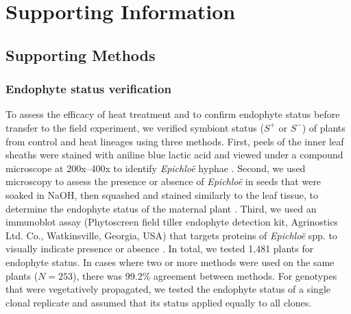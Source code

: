 \documentclass[12pt]{article}\usepackage[]{graphicx}\usepackage[dvipsnames]{xcolor}
\begin{document}
\setcounter{figure}{0}
\setcounter{table}{0}
\setcounter{equation}{0}
\setcounter{section}{0}

\renewcommand{\thesection}{S.\arabic{section}}

\renewcommand{\theequation}{S\arabic{equation}}

\renewcommand{\figurename}{Fig}
\renewcommand{\thefigure}{S\arabic{figure}}

\renewcommand{\thetable}{S\arabic{table}}
\renewcommand{\tablename}{Table}

\section {Supporting Information}
\subsection {Supporting Methods}
\subsubsection {Endophyte status verification}
To assess the efficacy of heat treatment and to confirm endophyte status before transfer to the field experiment, we verified symbiont status ($S^+$ or $S^-$) of plants from control and heat lineages using three methods. 
First, peels of the inner leaf sheaths were stained with aniline blue lactic acid and viewed under a compound microscope at 200x–400x to identify \emph{Epichloë} hyphae \citep{jackson1988rapid}. 
Second, we used microscopy to assess the presence or absence of \emph{Epichloë} in seeds that were soaked in NaOH, then squashed and stained similarly to the leaf tissue, to determine the endophyte status of the maternal plant \citep{fowler2025increasing}. 
Third, we used an immunoblot assay (Phytoscreen field tiller endophyte detection kit, Agrinostics Ltd. Co., Watkinsville, Georgia, USA) that targets proteins of \emph{Epichloë} spp. to visually indicate presence or absence \citep{koh2006rapid}. 
In total, we tested 1,481 plants for endophyte status. 
In cases where two or more methods were used on the same plants ($N=253$), there was 99.2\% agreement between methods.
For genotypes that were vegetatively propagated, we tested the endophyte status of a single clonal replicate and assumed that its status applied equally to all clones. 
\end{document}

